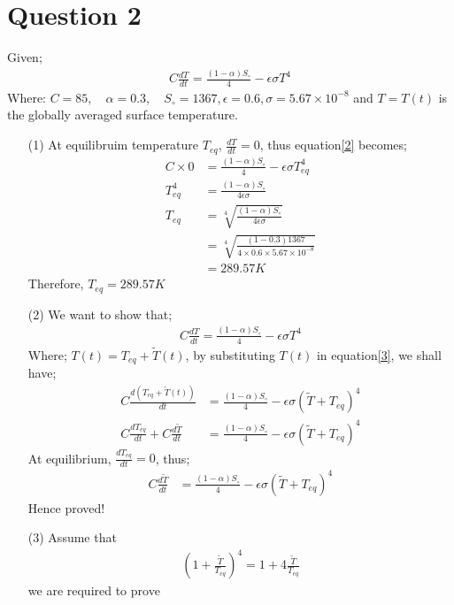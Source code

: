 \documentclass[12pt,a4paper]{article}
\begin{document}
\section*{Question 2}
Given;
\begin{align}
C\frac{dT}{dt}=\frac{(1-\alpha)S_{\circ}}{4}-\epsilon\sigma T^{4} \label{2}
\end{align}
Where: $C=85,\quad \alpha=0.3, \quad S_{\circ}=1367, \epsilon=0.6, \sigma =5.67\times 10^{-8}$ and $T=T(t)$ is the globally averaged surface temperature.
\begin{itemize}
	\item [(1)] At equilibruim temperature $T_{eq}$, $\frac{dT}{dt}=0$, thus equation\ref{2} becomes;
	\begin{align*}
	C\times 0&=\frac{(1-\alpha)S_{\circ}}{4}-\epsilon\sigma T^{4}_{eq}\\
	T^{4}_{eq}&=\frac{(1-\alpha)S_{\circ}}{4\epsilon\sigma}\\
	T_{eq}&=\sqrt[4]{\frac{(1-\alpha)S_{\circ}}{4\epsilon\sigma}}\\
	&=\sqrt[4]{\frac{(1-0.3)1367}{4\times 0.6\times 5.67\times 10^{-8} }}\\
	&=289.57K
	\end{align*}
	Therefore, $T_{eq}=289.57K$
	\item[(2)] We want to show that;
	\begin{align}
	C\frac{dT}{dt}=\frac{(1-\alpha)S_{\circ}}{4}-\epsilon\sigma	T^{4} \label{3}
	\end{align}
	Where; $T(t)=T_{eq}+\tilde{T}(t)$, by substituting $T(t)$ in equation\ref{3}, we shall have;
	\begin{align*}
	C\frac{d(T_{eq}+\tilde{T}(t))}{dt}&=\frac{(1-\alpha)S_{\circ}}{4}-\epsilon\sigma(\tilde{T}+T_{eq})^{4}\\
	C\frac{dT_{eq}}{dt}+C\frac{d\tilde{T}}{dt}&=\frac{(1-\alpha)S_{\circ}}{4}-\epsilon\sigma(\tilde{T}+T_{eq})^{4}
	\end{align*}
	At equilibrium, $\frac{dT_{eq}}{dt}=0$, thus;
	\begin{align}
	C\frac{d\tilde{T}}{dt}&=\frac{(1-\alpha)S_{\circ}}{4}-\epsilon\sigma(\tilde{T}+T_{eq})^{4} \label{5}
	\end{align}
	Hence proved!
	\item [(3)] Assume that
	\begin{align}
	\left(1+\frac{\tilde{T}}{T_{eq}}\right)^{4}=1 +4\frac{\tilde{T}}{T_{eq}} \label{6}
	\end{align}
	we are required to prove
	\begin{align*}

\end{align*}
\end{itemize}
\end{document}
